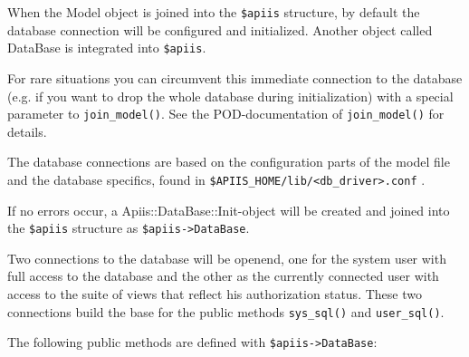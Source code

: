 
When the Model object is joined into the \verb+$apiis+ structure, by
default the database connection will be configured and initialized. Another
object called DataBase
is integrated into \verb+$apiis+. 

For rare situations you can circumvent this immediate connection to the
database (e.g. if you want to drop the whole database during
initialization) with a special parameter to
\verb+join_model()+. See the
POD-documentation of \verb+join_model()+ for details.

The database connections are based on the configuration
parts of the model file and the database specifics, found in
\verb+$APIIS_HOME/lib/<db_driver>.conf+%
.

If no errors occur, a Apiis::DataBase::Init-object will be created and
joined into the \verb+$apiis+ structure as \verb+$apiis->DataBase+.

Two connections to the database will be openend, one for the system
user
with full access to the database and the other as the currently connected
user
with access to the suite of views that reflect his authorization
status.
These two connections build the base for the public methods
\verb+sys_sql()+
and \verb+user_sql()+.

The following public methods are defined with
\verb+$apiis->DataBase+:

